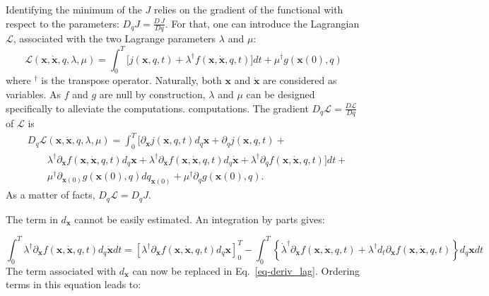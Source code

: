 \documentclass[aip,pof,nofootinbib,reprint,onecolumn]{revtex4-1}
\newcommand{\gras}[1]{\boldsymbol{#1}}
\newcommand{\mypar}[1]{\left(#1\right)}
\newcommand{\mya}[1]{\left\{#1\right\}}
\newcommand{\fdyn}{f} %
\newcommand{\costf}{J} %
\newcommand{\costff}{j} %
\newcommand{\lag}{\mathcal{L}} %
\newcommand{\point}{\gras{x}} %
\begin{document}
Identifying the minimum of the $\costf$ relies on the gradient of the
functional with respect to the parameters:
$D_q\costf = \frac{D\,\costf}{Dq}$. For that, one can introduce the
Lagrangian $\lag$, associated with the two Lagrange parameters $\lambda$ and
$\mu$:
\begin{equation}
  \lag\mypar{\point,\dot{\point},q,\lambda,\mu}
  =
  \int_0^T
  \bigg[
  \costff(\point,q,t) + \lambda^{\dagger}\fdyn(\point,\dot{\point},q,t)
  \bigg] dt + \mu^{\dagger} g(\point(0),q) 
\label{eq-lag}
\end{equation}
where $^{\dagger}$ is the transpose operator. Naturally, both $\point$ and $\dot{\point}$ are considered as variables.
As $\fdyn$ and $g$ are null by construction, $\lambda$ and $\mu$ can be designed specifically to alleviate the computations.
computations.
The gradient $D_q\lag = \frac{D\lag}{Dq}$ of $\lag$ is
\begin{equation}
\begin{split}
&D_q\lag\mypar{\point,\dot{\point},q,\lambda,\mu} = \int_0^T  \bigg[\partial_{\point}\costff(\point,q,t)d_q \point  +\partial_{q} \costff(\point,q,t) + \\
& \qquad \lambda^{\dagger} \partial_{\point}  \fdyn(\point,\dot{\point},q,t) d_q \point + \lambda^{\dagger}\partial_{\dot{\point}} \fdyn(\point,\dot{\point},q,t)d_q \dot{\point}  + \lambda^{\dagger}\partial_q\fdyn(\point,\dot{\point},q,t) \bigg]dt + \\
& \qquad \mu^{\dagger} \partial_{\point(0)} g(\point(0),q) dq_{\point(0)}  + \mu^{\dagger} \partial_q g(\point(0),q) .
\end{split}
\label{eq-deriv_lag}
\end{equation}
As a matter of facts, $D_q\lag = D_q \costf$.

The term in $d_{\dot{\point}}$ cannot be easily estimated. An integration by parts gives:

$$\int_0^T\lambda^{\dagger}\partial_{\dot{\point}} \fdyn(\point,\dot{\point},q,t)d_q \dot{\point} dt = [\lambda^{\dagger}\partial_{\dot{\point}} \fdyn(\point,\dot{\point},q,t) d_q \point ]_0^T - \int_0^T \mya{\dot{\lambda}^{\dagger}\partial_{\dot{\point}} \fdyn(\point,\dot{\point},q,t) + \lambda^{\dagger}d_t\partial_{\dot{\point}}\fdyn(\point,\dot{\point},q,t)}d_q \point dt$$
The term associated with $d_{\dot{\point}}$ can now be replaced in Eq.~\eqref{eq-deriv_lag}.
Ordering terms in this equation leads to:
\end{document}
